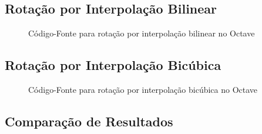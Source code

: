 \documentclass[12pt]{article}
\begin{document}
\subsection{Rotação por Interpolação Bilinear}\label{sec:rotacao:bilinear}

\begin{figure}[H]

\caption{Código-Fonte para rotação por interpolação bilinear no Octave}
\label{lst:rotate:bilinear}
\end{figure}

\subsection{Rotação por Interpolação Bicúbica}\label{sec:rotacao:bicubica}

\begin{figure}[H]

\caption{Código-Fonte para rotação por interpolação bicúbica no Octave}
\label{lst:rotate:bicubic}
\end{figure}

\subsection{Comparação de Resultados}\label{sec:rotacao:comparacao}
\end{document}
